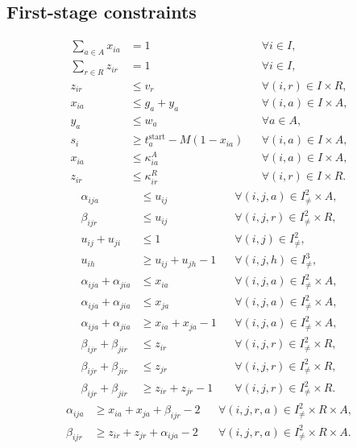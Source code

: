 \documentclass[11pt,a4paper]{article}
\begin{document}
\subsection*{First-stage constraints}
\begin{align}
\sum_{a\in A}x_{ia}&=1 &&\forall i\in I,\\
\sum_{r\in R}z_{ir}&=1 &&\forall i\in I,\\
z_{ir}&\leq v_r &&\forall (i,r)\in I\times R,\\
x_{ia}&\leq g_a+y_a &&\forall (i,a)\in I\times A,\\
y_a&\leq w_a &&\forall a\in A,\\
s_i&\geq t_a^{\mathrm{start}}-M(1-x_{ia}) &&\forall (i,a)\in I\times A,\\
x_{ia}&\leq\kappa^A_{ia} &&\forall (i,a)\in I\times A,\\
z_{ir}&\leq\kappa^R_{ir} &&\forall (i,r)\in I\times R.
\end{align}
\begin{align}
\alpha_{ija}&\leq u_{ij} &&\forall (i,j,a)\in I^2_{\ne}\times A,\\
\beta_{ijr}&\leq u_{ij} &&\forall (i,j,r)\in I^2_{\ne}\times R,\\
u_{ij}+u_{ji}&\leq 1 &&\forall (i,j)\in I^2_{\ne},\\
u_{ih}&\geq u_{ij}+u_{jh}-1 &&\forall (i,j,h)\in I^3_{\ne},\\
\alpha_{ija}+\alpha_{jia}&\leq x_{ia} &&\forall (i,j,a)\in I^2_{\ne}\times A,\\
\alpha_{ija}+\alpha_{jia}&\leq x_{ja} &&\forall (i,j,a)\in I^2_{\ne}\times A,\\
\alpha_{ija}+\alpha_{jia}&\geq x_{ia}+x_{ja}-1 &&\forall (i,j,a)\in I^2_{\ne}\times A,\\
\beta_{ijr}+\beta_{jir}&\leq z_{ir} &&\forall (i,j,r)\in I^2_{\ne}\times R,\\
\beta_{ijr}+\beta_{jir}&\leq z_{jr} &&\forall (i,j,r)\in I^2_{\ne}\times R,\\
\beta_{ijr}+\beta_{jir}&\geq z_{ir}+z_{jr}-1 &&\forall (i,j,r)\in I^2_{\ne}\times R.
\end{align}
\begin{align}
\alpha_{ija}&\geq x_{ia}+x_{ja}+\beta_{ijr}-2
&&\forall (i,j,r,a)\in I^2_{\ne}\times R\times A,\\
\beta_{ijr}&\geq z_{ir}+z_{jr}+\alpha_{ija}-2
&&\forall (i,j,r,a)\in I^2_{\ne}\times R\times A.
\end{align}
\end{document}
